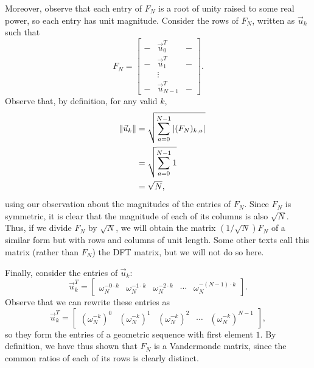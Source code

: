 \documentclass[letterpaper]{article}
\theoremstyle{remark}
\newcommand{\mat}[1]{\ensuremath{\begin{bmatrix}#1\end{bmatrix}}}
\newcommand{\eqn}[1]{\begin{alignat*}{2}#1\end{alignat*}}
\begin{document}
Moreover, observe that each entry of $F_N$ is a root of unity raised to some real power, so each entry has unit magnitude. Consider the rows of $F_N$, written as $\vec{u}_k$ such that
\[
    F_N = \mat{- & \vec{u}_0^T & - \\ - & \vec{u}_1^T & - \\ & \vdots & \\ - & \vec{u}_{N-1}^T & -}.
\]
Observe that, by definition, for any valid $k$,
\eqn{
    && \norm{\vec{u}_k} &= \sqrt{\sum_{a=0}^{N-1} \abs{(F_N)_{k, a}}} \\
    &&&= \sqrt{\sum_{a=0}^{N-1} 1} \\
    &&&= \sqrt{N},
}
using our observation about the magnitudes of the entries of $F_N$. Since $F_N$ is symmetric, it is clear that the magnitude of each of its columns is also $\sqrt{N}$. Thus, if we divide $F_N$ by $\sqrt{N}$, we will obtain the matrix $(1/\sqrt{N})F_N$ of a similar form but with rows and columns of unit length. Some other texts call this matrix (rather than $F_N$) the DFT matrix, but we will not do so here.

Finally, consider the entries of $\vec{u}_k$:
\[
    \vec{u}_k^T = \mat{\omega_N^{-0 \cdot k} & \omega_N^{-1 \cdot k} & \omega_N^{-2 \cdot k} & \cdots & \omega_N^{-(N-1) \cdot k}}.
\]
Observe that we can rewrite these entries as
\[
    \vec{u}_k^T = \mat{(\omega_N^{-k})^0 & (\omega_N^{-k})^1 & (\omega_N^{-k})^2 & \cdots & (\omega_N^{-k})^{N-1}},
\]
so they form the entries of a geometric sequence with first element $1$. By definition, we have thus shown that $F_N$ is a Vandermonde matrix, since the common ratios of each of its rows is clearly distinct.
\end{document}
